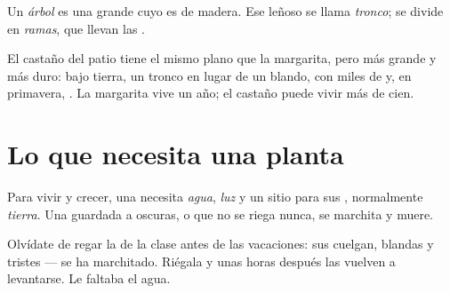 \begin{definition}[Árbol]\label{def:g1:plants-around-us:tree}
Un \emph{árbol} es una  grande cuyo  es de
madera. Ese  leñoso se llama \emph{tronco}; se
divide en \emph{ramas}, que llevan las .
\end{definition}

\begin{example}[El castaño]\label{ex:g1:plants-around-us:tree}
El castaño del patio tiene el mismo plano que la margarita, pero más
grande y más duro:  bajo tierra, un tronco en lugar de un 
blando,  con miles de  y, en primavera, . La margarita
vive un año; el castaño puede vivir más de cien.
\end{example}

\section{Lo que necesita una planta}

\begin{proposition}\label{prop:g1:plants-around-us:needs}
Para vivir y crecer, una  necesita \emph{agua}, \emph{luz} y un
sitio para sus , normalmente \emph{tierra}. Una
 guardada a oscuras, o que no se riega nunca, se marchita y muere.
\end{proposition}
\admitted

\begin{example}\label{ex:g1:plants-around-us:wilt}
Olvídate de regar la  de la clase antes de las vacaciones: sus
 cuelgan, blandas y tristes --- se ha marchitado. Riégala y unas
horas después las  vuelven a levantarse. Le faltaba el agua.
\end{example}

